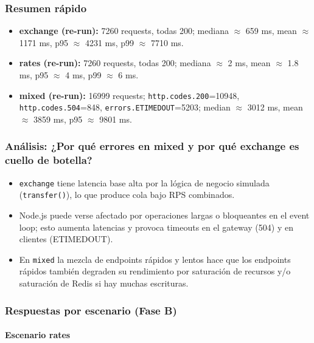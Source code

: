 \subsubsection{Resumen rápido}

\begin{itemize}[leftmargin=*]
    \item \textbf{exchange (re-run):} 7260 requests, todas 200; mediana $\approx$ 659 ms, mean $\approx$ 1171 ms, p95 $\approx$ 4231 ms, p99 $\approx$ 7710 ms.

    \item \textbf{rates (re-run):} 7260 requests, todas 200; mediana $\approx$ 2 ms, mean $\approx$ 1.8 ms, p95 $\approx$ 4 ms, p99 $\approx$ 6 ms.

    \item \textbf{mixed (re-run):} 16999 requests; \texttt{http.codes.200}=10948, \texttt{http.codes.504}=848, \texttt{errors.ETIMEDOUT}=5203; median $\approx$ 3012 ms, mean $\approx$ 3859 ms, p95 $\approx$ 9801 ms.
\end{itemize}


\subsubsection{Análisis: ¿Por qué errores en mixed y por qué exchange es cuello de botella?}

\begin{itemize}[leftmargin=*]
    \item \texttt{exchange} tiene latencia base alta por la lógica de negocio simulada (\texttt{transfer()}), lo que produce cola bajo RPS combinados.

    \item Node.js puede verse afectado por operaciones largas o bloqueantes en el event loop; esto aumenta latencias y provoca timeouts en el gateway (504) y en clientes (ETIMEDOUT).

    \item En \texttt{mixed} la mezcla de endpoints rápidos y lentos hace que los endpoints rápidos también degraden su rendimiento por saturación de recursos y/o saturación de Redis si hay muchas escrituras.
\end{itemize}


\subsubsection{Respuestas por escenario (Fase B)}

\paragraph{Escenario rates}

